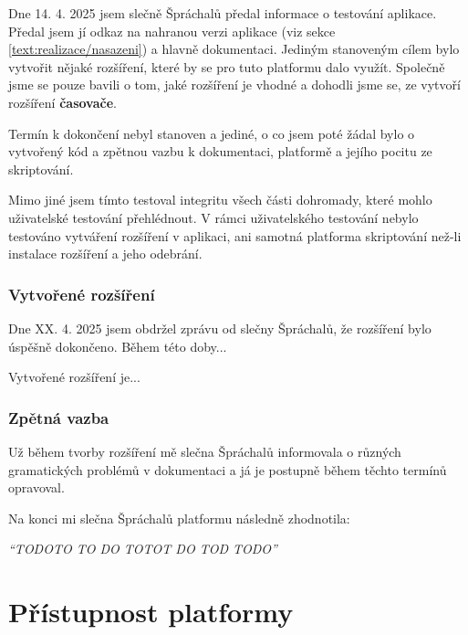 Dne 14. 4. 2025 jsem slečně Špráchalů předal informace o testování aplikace.
Předal jsem jí odkaz na nahranou verzi aplikace (viz sekce \ref{text:realizace/nasazeni}) a hlavně dokumentaci.
Jediným stanoveným cílem bylo vytvořit nějaké rozšíření, které by se pro tuto platformu dalo využít.
Společně jsme se pouze bavili o tom, jaké rozšíření je vhodné a dohodli jsme se, ze vytvoří rozšíření \textbf{časovače}.

Termín k dokončení nebyl stanoven a jediné, o co jsem poté žádal bylo o vytvořený kód a zpětnou vazbu k dokumentaci, platformě a jejího pocitu ze skriptování.

Mimo jiné jsem tímto testoval integritu všech části dohromady, které mohlo uživatelské testování přehlédnout.
V rámci uživatelského testování nebylo testováno vytváření rozšíření v aplikaci, ani samotná platforma skriptování než-li instalace rozšíření a jeho odebrání.

\subsubsection{Vytvořené rozšíření}

Dne XX. 4. 2025 jsem obdržel zprávu od slečny Špráchalů, že rozšíření bylo úspěšně dokončeno.
Během této doby...

Vytvořené rozšíření je...

\subsubsection{Zpětná vazba}

Už během tvorby rozšíření mě slečna Špráchalů informovala o různých gramatických problémů v dokumentaci a já je postupně během těchto termínů opravoval.

Na konci mi slečna Špráchalů platformu následně zhodnotila:

\textit{\enquote{TODOTO TO DO TOTOT DO TOD TODO}}





\section{Přístupnost platformy}


